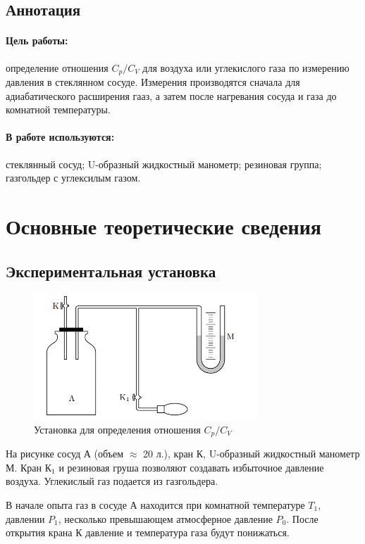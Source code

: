 \documentclass[a4paper,12pt]{article}
\begin{document}
	
	\newpage
    
    \subsection*{Аннотация}
        \paragraph*{Цель работы:} определение отношения $C_p/C_V$ для воздуха или углекислого газа по измерению давления в стеклянном сосуде. Измерения производятся сначала для адиабатического расширения гааз, а затем после нагревания сосуда и газа до комнатной температуры.
        \paragraph*{В работе используются:} стеклянный сосуд; U-образный жидкостный манометр; резиновая группа; газгольдер с углексилым газом.
    \section{Основные теоретические сведения}
    \subsection*{Экспериментальная установка}
        \begin{figure}[H]
            \includegraphics*[width=0.75\textwidth]{ustanovka.png}
            \centering
            \caption{Установка для определения отношения $C_p/C_V$}
        \end{figure}
        На рисунке сосуд А (объем $\approx$ 20 л.), кран К, U-образный жидкостный манометр М. Кран К$_1$ и резиновая груша позволяют создавать избыточное давление воздуха. Углекислый газ подается из газгольдера.

        В начале опыта газ в сосуде А находится при комнатной температуре $T_1$, давлении $P_1$, несколько превышающем атмосферное давление $P_0$. После открытия крана К давление и температура газа будут понижаться.
\end{document}
